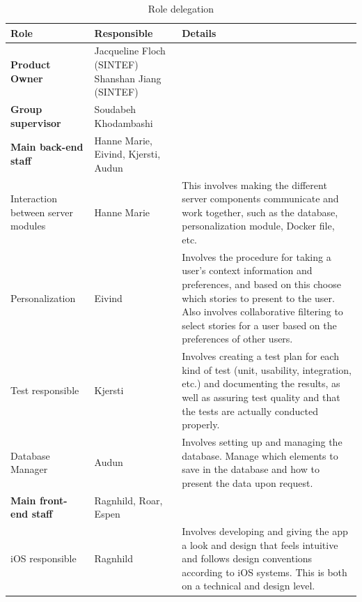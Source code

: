 \begin{table}[!h]
	\small
	\centering
		\caption{Role delegation}
		\begin{tabular}{ | p{2.5cm} | p{2.8cm} | p{12cm} |}
			\hline
			\textbf{Role} & \textbf{Responsible} & \textbf{Details} \\ \hline
			
			\textbf{Product Owner} & Jacqueline Floch (SINTEF) \newline Shanshan Jiang (SINTEF) & \\ \hline
			
			\textbf{Group supervisor} & Soudabeh Khodambashi & \\ \hline
			
			\textbf{Main back-end staff} & Hanne Marie, Eivind, Kjersti, Audun & \\ \hline
			
			Interaction between server modules & Hanne Marie & This involves making the different server components communicate and work together, such as the database, personalization module, Docker file, etc. \\ \hline
			
			Personalization & Eivind & Involves the procedure for taking a user's context information and preferences, and based on this choose which stories to present to the user. Also involves collaborative filtering to select stories for a user based on the preferences of other users. \\ \hline
			
			Test responsible & Kjersti & Involves creating a test plan for each kind of test (unit, usability, integration, etc.) and documenting the results, as well as assuring test quality and that the tests are actually conducted properly. \\ \hline
			
			Database Manager & Audun & Involves setting up and managing the database. Manage which elements to save in the database and how to present the data upon request. \\ \hline
			
			\textbf{Main front-end staff} & Ragnhild, Roar, Espen & \\ \hline
			
			iOS responsible & Ragnhild & Involves developing and giving the app a look and design that feels intuitive and follows design conventions according to iOS systems. This is both on a technical and design level. \\ \hline
			

\end{tabular}
\end{table}
